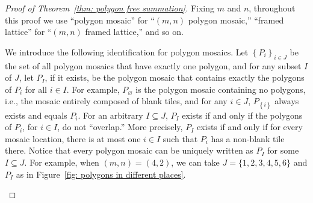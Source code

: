 \documentclass[12pt]{article}
\theoremstyle{plain}
\theoremstyle{remark}
\theoremstyle{definition}
\theoremstyle{remark}
\theoremstyle{definition}
\newcommand{\cell}[4]{ \draw[thick] ( #1 , #2 ) rectangle ( #3 , #4 );}
\newcommand{\cellA}[4]{ \draw[thick] ( #1 , #2 ) rectangle ( #3 , #4 ); \draw[red, thick, densely dotted] (#3 * 0.5 + #1 * 0.5 , #2) -- (#1, #4 * 0.5 + #2 * 0.5);}
\newcommand{\cellB}[4]{ \draw[thick] ( #1 , #2 ) rectangle ( #3 , #4 ); \draw[red, thick, densely dotted] (#3 * 0.5 + #1 * 0.5 , #2) -- (#3, #4 * 0.5 + #2 * 0.5);}
\newcommand{\cellC}[4]{ \draw[thick] ( #1 , #2 ) rectangle ( #3 , #4 ); \draw[red, thick, densely dotted] (#3 * 0.5 + #1 * 0.5 , #4) -- (#3, #4 * 0.5 + #2 * 0.5);}
\newcommand{\cellD}[4]{ \draw[thick] ( #1 , #2 ) rectangle ( #3 , #4 ); \draw[red, thick, densely dotted] (#3 * 0.5 + #1 * 0.5 , #4) -- (#1, #4 * 0.5 + #2 * 0.5);}
\newcommand{\cellF}[4]{ \draw[thick] ( #1 , #2 ) rectangle ( #3 , #4 ); \draw[red, thick, densely dotted] (#3 * 0.5 + #1 * 0.5 , #2) -- (#3 * 0.5 + #1 * 0.5 , #4);}
\newcommand{\lablnode}[3]{\node[shape=circle,draw=none,fill=none, inner sep=0pt,minimum size=0pt] (A) at ( #1 , #2 ) {#3};}
\begin{document}
\begin{proof}[Proof of Theorem~\ref{thm: polygon free summation}]
 Fixing $m$ and $n$, throughout this proof we use ``polygon mosaic''
for ``$\left(m,n\right)$ polygon mosaic,'' ``framed lattice''
for ``$\left(m,n\right)$ framed lattice,'' and so on.

We introduce the following identification for polygon mosaics. Let $\left\{ P_{i}\right\} _{i\in J}$ be the set of all polygon mosaics that have exactly one polygon, and for any subset $I$ of $J$, let $P_{I}$, if it exists, be the polygon mosaic that contains exactly the polygons of $P_{i}$ for all $i\in I$. For example, $P_{\varnothing}$ is the polygon mosaic containing no polygons, i.e., the mosaic entirely composed of blank tiles, and for any $i\in J$, $P_{\left\{ i\right\} }$ always exists and equals $P_{i}$. For an arbitrary $I\subseteq J$, $P_{I}$ exists if and only if the polygons of $P_{i}$, for $i\in I$, do not ``overlap.'' More precisely, $P_{I}$ exists if and only if for every mosaic location, there is at most one $i\in I$ such that $P_{i}$ has a non-blank tile there. Notice that every polygon mosaic can be uniquely written as $P_{I}$ for some $I\subseteq J$. For example, when $(m,n)=(4,2)$, we can take $J=\{1,2,3,4,5,6\}$ and $P_I$ as in Figure~\ref{fig: polygons in different places}.

\begin{figure}[h!]
\begin{center}
\end{center}
\end{figure}
\end{proof}
\end{document}

